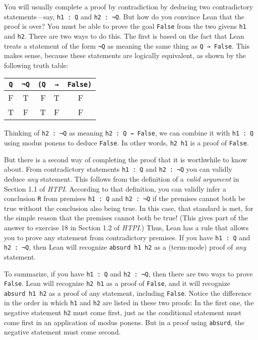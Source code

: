 \documentclass[
  letterpaper,
  DIV=11,
  numbers=noendperiod]{scrreprt}
\newcommand{\excl}[1]{}
\theoremstyle{remark}
\begin{document}
You will usually complete a proof by contradiction by deducing two
contradictory statements---say, \texttt{h1\ :\ Q} and
\texttt{h2\ :\ ¬Q}. But how do you convince Lean that the proof is over?
You must be able to prove the goal \texttt{False} from the two givens
\texttt{h1} and \texttt{h2}. There are two ways to do this. The first is
based on the fact that Lean treats a statement of the form \texttt{¬Q}
as meaning the same thing as \texttt{Q\ →\ False}. This makes sense,
because these statements are logically equivalent, as shown by the
following truth table:

\begin{longtable}[]{@{}ccrcl@{}}
\toprule\noalign{}
\texttt{Q} & \texttt{¬Q} & \texttt{(Q} & \texttt{→} & \texttt{False)} \\
\midrule\noalign{}
\endhead
\bottomrule\noalign{}
\endlastfoot
F & T & F & T & ~~\excl{~} F \\
T & F & T & F & ~~\excl{~} F \\
\end{longtable}

Thinking of \texttt{h2\ :\ ¬Q} as meaning \texttt{h2\ :\ Q\ →\ False},
we can combine it with \texttt{h1\ :\ Q} using modus ponens to deduce
\texttt{False}. In other words, \texttt{h2\ h1} is a proof of
\texttt{False}.

But there is a second way of completing the proof that it is worthwhile
to know about. From contradictory statements \texttt{h1\ :\ Q} and
\texttt{h2\ :\ ¬Q} you can validly deduce \emph{any} statement. This
follows from the definition of a \emph{valid argument} in Section 1.1 of
\emph{HTPI}. According to that definition, you can validly infer a
conclusion \texttt{R} from premises \texttt{h1\ :\ Q} and
\texttt{h2\ :\ ¬Q} if the premises cannot both be true without the
conclusion also being true. In this case, that standard is met, for the
simple reason that the premises cannot both be true! (This gives part of
the answer to exercise 18 in Section 1.2 of \emph{HTPI}.) Thus, Lean has
a rule that allows you to prove any statement from contradictory
premises. If you have \texttt{h1\ :\ Q} and \texttt{h2\ :\ ¬Q}, then
Lean will recognize \texttt{absurd\ h1\ h2} as a (term-mode) proof of
\emph{any} statement.

To summarize, if you have \texttt{h1\ :\ Q} and \texttt{h2\ :\ ¬Q}, then
there are two ways to prove \texttt{False}. Lean will recognize
\texttt{h2\ h1} as a proof of \texttt{False}, and it will recognize
\texttt{absurd\ h1\ h2} as a proof of any statement, including
\texttt{False}. Notice the difference in the order in which \texttt{h1}
and \texttt{h2} are listed in these two proofs: In the first one, the
negative statement \texttt{h2} must come first, just as the conditional
statement must come first in an application of modus ponens. But in a
proof using \texttt{absurd}, the negative statement must come second.
\end{document}
